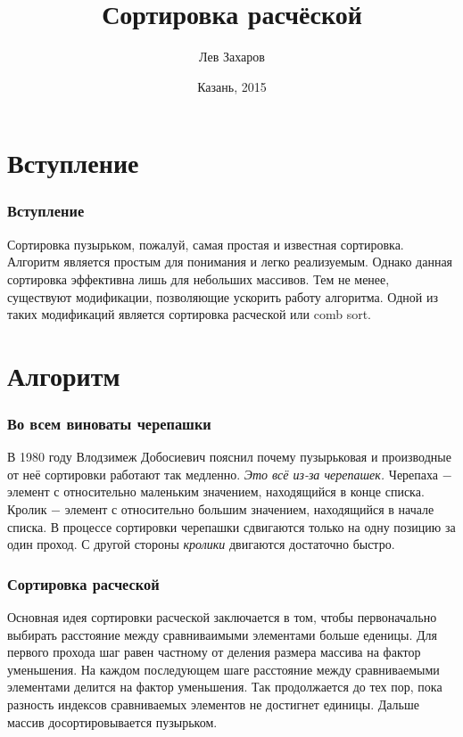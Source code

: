 \documentclass{beamer}
\newcommand{\br}{\pause \linebreak \linebreak}
\newcommand{\nl}{\pause \linebreak}
\begin{document}
\title{Сортировка расчёской}
\author{Лев Захаров}
\date{Казань, 2015}
\frame{\titlepage}

\section{Вступление}
\begin{frame}
    \frametitle{Вступление}
        Сортировка пузырьком, пожалуй, самая простая и известная сортировка. Алгоритм является простым для понимания и легко реализуемым.
        Однако данная сортировка эффективна лишь для небольших массивов. Тем не менее, существуют модификации, позволяющие ускорить работу алгоритма.
        Одной из таких модификаций является \alert{сортировка расческой} или \alert{comb sort}.
\end{frame}

\section{Алгоритм}
\begin{frame}
    \frametitle{Во всем виноваты черепашки}
        В 1980 году Влодзимеж Добосиевич пояснил почему пузырьковая и производные от неё сортировки работают так медленно. \textit{Это всё из-за черепашек.}
        \br
        \alert{Черепаха} $-$ элемент с относительно маленьким значением, находящийся в конце списка.
        \nl
        \alert{Кролик} $-$ элемент с относительно большим значением, находящийся в начале списка.
        \br
        В процессе сортировки черепашки сдвигаются только на одну позицию за один проход. С другой стороны \textit{кролики} двигаются достаточно быстро.

\end{frame}

\begin{frame}
    \frametitle{Сортировка расческой}
    Основная идея сортировки расческой заключается в том, чтобы первоначально выбирать расстояние между сравниваимыми элементами больше еденицы.
    \br
    Для первого прохода шаг равен частному от деления размера массива на \alert{фактор уменьшения}.
    \nl
    На каждом последующем шаге расстояние между сравниваемыми элементами делится на \alert{фактор уменьшения}.
    \br
    Так продолжается до тех пор, пока разность индексов сравниваемых элементов не достигнет единицы.
    Дальше массив досортировывается пузырьком.
\end{frame}
\end{document}
